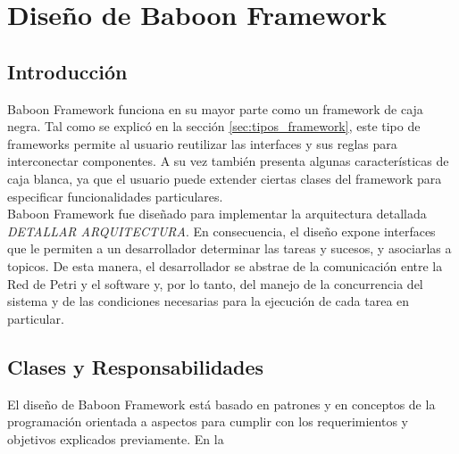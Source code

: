 \section{Diseño de Baboon Framework}

\subsection{Introducción}
Baboon Framework funciona en su mayor parte como un framework de caja negra.
Tal como se explicó en la sección \autoref{sec:tipos_framework}, este tipo de
frameworks permite al usuario reutilizar las interfaces y sus reglas para
interconectar componentes.
A su vez también presenta algunas características de caja blanca,
ya que el usuario puede extender ciertas clases del framework para especificar
funcionalidades particulares.\\
Baboon Framework fue diseñado para implementar la arquitectura detallada
\emph{\color{red} DETALLAR ARQUITECTURA}.
En consecuencia, el diseño expone interfaces que le permiten a un desarrollador
determinar las tareas y sucesos, y asociarlas a topicos. De esta manera, el desarrollador
se abstrae de la comunicación entre la Red de Petri y el software y, por lo
tanto, del manejo de la concurrencia del sistema y de las condiciones
necesarias para la ejecución de cada tarea en particular.

\subsection{Clases y Responsabilidades}
El diseño de Baboon Framework está basado en patrones y en conceptos de la
programación orientada a aspectos para cumplir con los requerimientos y
objetivos explicados previamente.
En la 

